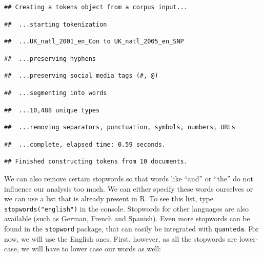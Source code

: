 \documentclass[
]{book}
\begin{document}
\begin{verbatim}
## Creating a tokens object from a corpus input...
\end{verbatim}

\begin{verbatim}
##  ...starting tokenization
\end{verbatim}

\begin{verbatim}
##  ...UK_natl_2001_en_Con to UK_natl_2005_en_SNP
\end{verbatim}

\begin{verbatim}
##  ...preserving hyphens
\end{verbatim}

\begin{verbatim}
##  ...preserving social media tags (#, @)
\end{verbatim}

\begin{verbatim}
##  ...segmenting into words
\end{verbatim}

\begin{verbatim}
##  ...10,488 unique types
\end{verbatim}

\begin{verbatim}
##  ...removing separators, punctuation, symbols, numbers, URLs
\end{verbatim}

\begin{verbatim}
##  ...complete, elapsed time: 0.59 seconds.
\end{verbatim}

\begin{verbatim}
## Finished constructing tokens from 10 documents.
\end{verbatim}

We can also remove certain stopwords so that words like ``and'' or ``the'' do not influence our analysis too much. We can either specify these words ourselves or we can use a list that is already present in R. To see this list, type \texttt{stopwords("english")} in the console. Stopwords for other languages are also available (such as German, French and Spanish). Even more stopwords can be found in the \texttt{stopword} package, that can easily be integrated with \texttt{quanteda}. For now, we will use the English ones. First, however, as all the stopwords are lower-case, we will have to lower case our words as well:
\end{document}
